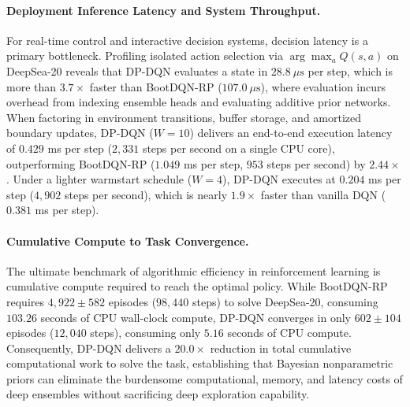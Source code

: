 \documentclass[10pt]{article}
\begin{document}
\paragraph{Deployment Inference Latency and System Throughput.}
For real-time control and interactive decision systems, decision latency is a primary bottleneck. Profiling isolated action selection via $\arg\max_a Q(s, a)$ on DeepSea-20 reveals that DP-DQN evaluates a state in $28.8\ \mu\text{s}$ per step, which is more than $3.7\times$ faster than BootDQN-RP ($107.0\ \mu\text{s}$), where evaluation incurs overhead from indexing ensemble heads and evaluating additive prior networks. When factoring in environment transitions, buffer storage, and amortized boundary updates, DP-DQN ($W=10$) delivers an end-to-end execution latency of $0.429$ ms per step ($2{,}331$ steps per second on a single CPU core), outperforming BootDQN-RP ($1.049$ ms per step, $953$ steps per second) by $2.44\times$. Under a lighter warmstart schedule ($W=4$), DP-DQN executes at $0.204$ ms per step ($4{,}902$ steps per second), which is nearly $1.9\times$ faster than vanilla DQN ($0.381$ ms per step).

\paragraph{Cumulative Compute to Task Convergence.}
The ultimate benchmark of algorithmic efficiency in reinforcement learning is cumulative compute required to reach the optimal policy. While BootDQN-RP requires $4{,}922 \pm 582$ episodes ($98{,}440$ steps) to solve DeepSea-20, consuming $103.26$ seconds of CPU wall-clock compute, DP-DQN converges in only $602 \pm 104$ episodes ($12{,}040$ steps), consuming only $5.16$ seconds of CPU compute. Consequently, DP-DQN delivers a $20.0\times$ reduction in total cumulative computational work to solve the task, establishing that Bayesian nonparametric priors can eliminate the burdensome computational, memory, and latency costs of deep ensembles without sacrificing deep exploration capability.
\end{document}
